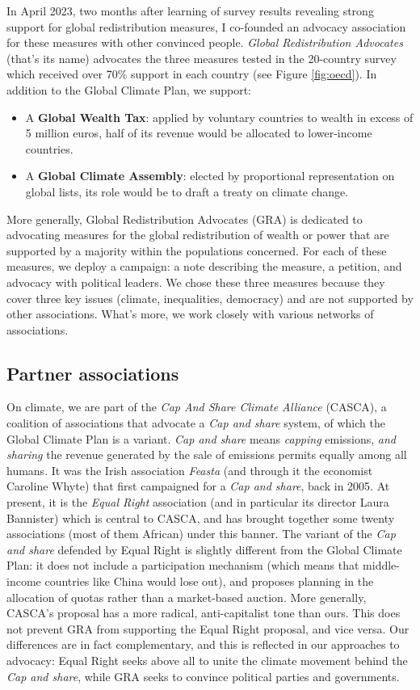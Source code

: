 \documentclass[a5paper,english,openany]{memoir}
\begin{document}
In April 2023, two months after learning of survey results revealing strong support for global redistribution measures, I co-founded an advocacy association for these measures with other convinced people. \textit{Global Redistribution Advocates} (that's its name) advocates the three measures tested in the 20-country survey which received over 70\% support in each country (see Figure \ref{fig:oecd}). In addition to the Global Climate Plan, we support: 
\begin{itemize}
  \item A \textbf{Global Wealth Tax}: applied by voluntary countries to wealth in excess of 5 million euros, half of its revenue would be allocated to lower-income countries.
  \item A \textbf{Global Climate Assembly}: elected by proportional representation on global lists, its role would be to draft a treaty on climate change.
\end{itemize}

More generally, Global Redistribution Advocates (GRA) is dedicated to advocating measures for the global redistribution of wealth or power that are supported by a majority within the populations concerned. For each of these measures, we deploy a campaign: a note describing the measure, a petition, and advocacy with political leaders. We chose these three measures because they cover three key issues (climate, inequalities, democracy) and are not supported by other associations. What's more, we work closely with various networks of associations. 

\subsection{Partner associations}

On climate, we are part of the \textit{Cap And Share Climate Alliance} (CASCA), a coalition of associations that advocate a \textit{Cap and share} system, of which the Global Climate Plan is a variant. \textit{Cap and share} means \textit{capping} emissions, \textit{and sharing} the revenue generated by the sale of emissions permits equally among all humans. It was the Irish association \textit{Feasta} (and through it the economist Caroline Whyte) that first campaigned for a \textit{Cap and share}, back in 2005. At present, it is the \textit{Equal Right} association (and in particular its director Laura Bannister) which is central to CASCA, and has brought together some twenty associations (most of them African) under this banner. The variant of the \textit{Cap and share} defended by Equal Right is slightly different from the Global Climate Plan: it does not include a participation mechanism (which means that middle-income countries like China would lose out), and proposes planning in the allocation of quotas rather than a market-based auction. More generally, CASCA's proposal has a more radical, anti-capitalist tone than ours. This does not prevent GRA from supporting the Equal Right proposal, and vice versa. Our differences are in fact complementary, and this is reflected in our approaches to advocacy: Equal Right seeks above all to unite the climate movement behind the \textit{Cap and share}, while GRA seeks to convince political parties and governments. 
\end{document}

